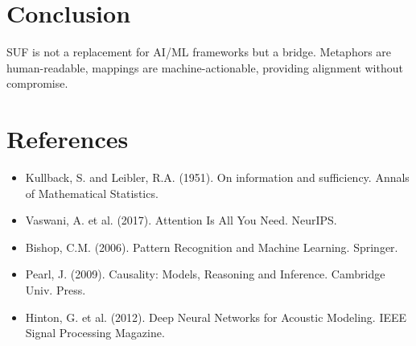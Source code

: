 \documentclass[11pt]{article}
\begin{document}
\section{Conclusion}
SUF is not a replacement for AI/ML frameworks but a bridge. 
Metaphors are human-readable, mappings are machine-actionable, 
providing alignment without compromise.

\section{References}
\begin{itemize}
\item Kullback, S. and Leibler, R.A. (1951). On information and sufficiency. Annals of Mathematical Statistics.
\item Vaswani, A. et al. (2017). Attention Is All You Need. NeurIPS.
\item Bishop, C.M. (2006). Pattern Recognition and Machine Learning. Springer.
\item Pearl, J. (2009). Causality: Models, Reasoning and Inference. Cambridge Univ. Press.
\item Hinton, G. et al. (2012). Deep Neural Networks for Acoustic Modeling. IEEE Signal Processing Magazine.
\end{itemize}
\end{document}

